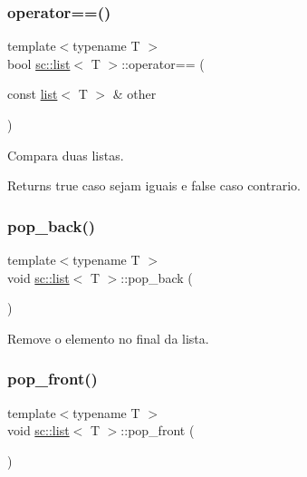 \subsubsection{\texorpdfstring{operator==()}{operator==()}}
{\footnotesize\ttfamily template$<$typename T $>$ \\
bool \hyperlink{classsc_1_1list}{sc\+::list}$<$ T $>$\+::operator== (\begin{DoxyParamCaption}\item[{const \hyperlink{classsc_1_1list}{list}$<$ T $>$ \&}]{other }\end{DoxyParamCaption})\hspace{0.3cm}{\ttfamily [inline]}}

Compara duas listas. \begin{DoxyReturn}{Returns}
true caso sejam iguais e false caso contrario. 
\end{DoxyReturn}
\mbox{\label{classsc_1_1list_a3d6fc0a4f2c1db7c74af5a482c1a03ca}} 
\subsubsection{\texorpdfstring{pop\+\_\+back()}{pop\_back()}}
{\footnotesize\ttfamily template$<$typename T $>$ \\
void \hyperlink{classsc_1_1list}{sc\+::list}$<$ T $>$\+::pop\+\_\+back (\begin{DoxyParamCaption}{ }\end{DoxyParamCaption})\hspace{0.3cm}{\ttfamily [inline]}}

Remove o elemento no final da lista. \mbox{\label{classsc_1_1list_ab3fbf66643f4356cf0c1947bd4fdf48e}} 
\subsubsection{\texorpdfstring{pop\+\_\+front()}{pop\_front()}}
{\footnotesize\ttfamily template$<$typename T $>$ \\
void \hyperlink{classsc_1_1list}{sc\+::list}$<$ T $>$\+::pop\+\_\+front (\begin{DoxyParamCaption}{ }\end{DoxyParamCaption})\hspace{0.3cm}{\ttfamily [inline]}}

